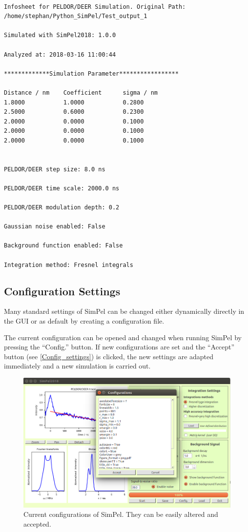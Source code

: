 \documentclass[pdftex,bezier,german,a4,twoside, headexclude,12pt,nochapterprefix, titlepage]{extarticle}
\newcommand{\simpel}{\textsf{SimPel}}
\begin{document}
\begin{lstlisting}[caption={Example for an automatically aved information sheet.},label = Information_sheet]

Infosheet for PELDOR/DEER Simulation. Original Path:
/home/stephan/Python_SimPel/Test_output_1

Simulated with SimPel2018: 1.0.0

Analyzed at: 2018-03-16 11:00:44

*************Simulation Parameter*****************

Distance / nm 	 Coefficient	  sigma / nm
1.8000	         1.0000	          0.2800	         
2.5000	         0.6000	          0.2300	         
2.0000	         0.0000	          0.1000	         
2.0000	         0.0000	          0.1000	         
2.0000	         0.0000	          0.1000	         


PELDOR/DEER step size: 8.0 ns

PELDOR/DEER time scale: 2000.0 ns

PELDOR/DEER modulation depth: 0.2

Gaussian noise enabled: False

Background function enabled: False

Integration method: Fresnel integrals
\end{lstlisting}


\clearpage

\subsection{Configuration Settings}

Many standard settings of \simpel{} can be changed either dynamically directly in the GUI or as default by creating a configuration file.

The current configuration can be opened and changed when running  \simpel{} by pressing the ``Config.'' button. If new configurations are set and the ``Accept'' button (see \autoref{Config_settings}) is clicked, the new settings are adapted immediately and a new simulation is carried out.

\begin{figure}[!htb]
\centering
\includegraphics[scale=0.5]{Config_example.png}
    \caption{Current configurations of  \simpel. They can be easily altered and accepted.}
   \label{Config_settings}
\end{figure}
\end{document}
